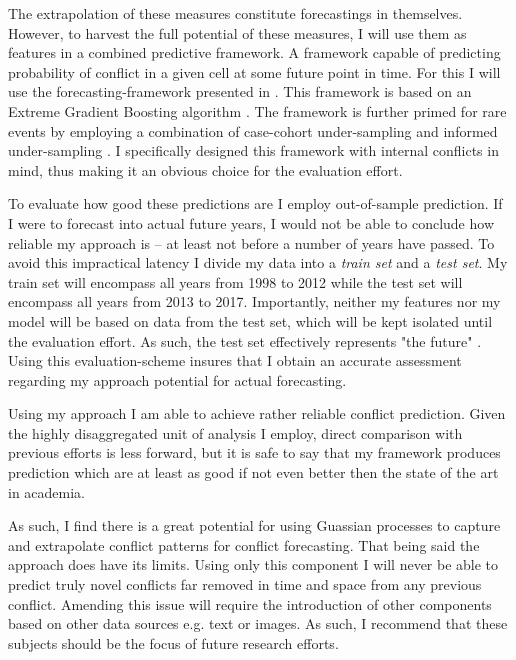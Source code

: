 \documentclass[a4paper]{article}
\begin{document}
The extrapolation of these measures constitute forecastings in themselves. However, to harvest the full potential of these measures, I will use them as features in a combined predictive framework. A framework capable of predicting probability of conflict in a given cell at some future point in time. For this I will use the forecasting-framework presented in \cite{Maase}. This framework is based on an Extreme Gradient Boosting algorithm \citep{Chen_2016}. The framework is further primed for rare events by employing a combination of case-cohort under-sampling \citep[142]{King_Zeng_2001} and informed under-sampling \cite[1267]{He_2008}. I specifically designed this framework with internal conflicts in mind, thus making it an obvious choice for the evaluation effort.\par 

To evaluate how good these predictions are I employ out-of-sample prediction. If I were to forecast into actual future years, I would not be able to conclude how reliable my approach is -- at least not before a number of years have passed. To avoid this impractical latency I divide my data into a \emph{train set} and a \emph{test set}. My train set will encompass all years from 1998 to 2012 while the test set will encompass all years from 2013 to 2017. Importantly, neither my features nor my model will be based on data from the test set, which will be kept isolated until the evaluation effort. As such, the test set effectively represents "the future" \cite[199-200]{Goldstone_2010}. Using this evaluation-scheme insures that I obtain an accurate assessment regarding my approach potential for actual forecasting.\par 

Using my approach I am able to achieve rather reliable conflict prediction. Given the highly disaggregated unit of analysis I employ, direct comparison with previous efforts is less forward, but it is safe to say that my framework produces prediction which are at least as good if not even better then the state of the art in academia.\par %

As such, I find there is a great potential for using Guassian processes to capture and extrapolate conflict patterns for conflict forecasting. That being said the approach does have its limits. Using only this component I will never be able to predict truly novel conflicts far removed in time and space from any previous conflict. Amending this issue will require the introduction of other components based on other data sources e.g. text or images. As such, I recommend that these subjects should be the focus of future research efforts.\par 
\end{document}
